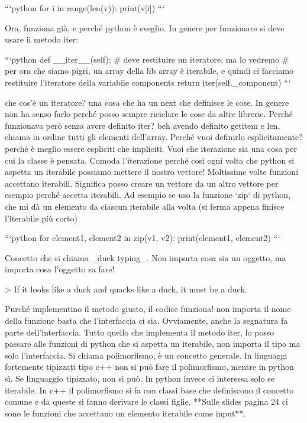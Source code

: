 \documentclass[10pt, a4paper, twosided, titlepage, draft]{book}
\begin{document}
```python
for i in range(len(v)):
print(v[i])
```


Ora, funziona già, e perché python è sveglio. In genere per funzionare si deve usare il metodo iter:

```python
def __iter__(self):
# deve restituire un iteratore, ma lo vedremo
# per ora che siamo pigri, un array della lib array è iterabile, e quindi ci facciamo restituire l'iteratore della variabile components
return iter(self._component)
```

che cos'è un iteratore? una cosa che ha un next che definisce le cose. 
In genere non ha senso farlo perché posso sempre riciclare le cose da altre librerie.
Perché funzionava però senza avere definito iter? beh avendo definito getitem e len, chiama in ordine tutti gli elementi dell'array.
Perché vuoi definirlo esplicitamente? perché è meglio essere espliciti che impliciti. Vuoi che iterazione sia una cosa per cui la classe è pensata.
Comoda l'iterazione perché così ogni volta che python si aspetta un iterabile possiamo mettere il nostro vettore! Moltissime volte funzioni accettano iterabili. Significa posso creare un vettore da un altro vettore per esempio perché accetta iterabili.
Ad esempio se uso la funzione `zip` di python, che mi dà un elemento da ciascun iterabile alla volta (si ferma appena finisce l'iterabile più corto)

```python
for element1, element2 in zip(v1, v2):
print(element1, element2)
```

Concetto che si chiama _duck typing_. Non importa cosa sia un oggetto, ma importa cosa l'oggetto sa fare!

> If it looks like a duck and quacks like a duck, it must be a duck.

Purché implementino il metodo giusto, il codice funziona! non importa il nome della funzione basta che l'interfaccia ci sia. Ovviamente, anche la segnatura fa parte dell'interfaccia. Tutto quello che implementa il metodo iter, lo posso passare alle funzioni di python che si aspetta un iterabile, non importa il tipo ma solo l'interfaccia. Si chiama polimorfismo, è un concetto generale.
In linguaggi fortemente tipizzati tipo c++ non si può fare il polimorfismo, mentre in python sì. Se linguaggio tipizzato, non si può. In python invece ci interessa solo se iterabile.
In c++ il polimorfismo si fa con classi base che definiscono il concetto comune e da queste si fanno derivare le classi figlie.
**Sulle slides pagina 24 ci sono le funzioni che accettano un elemento iterabile come input**.
\end{document}
